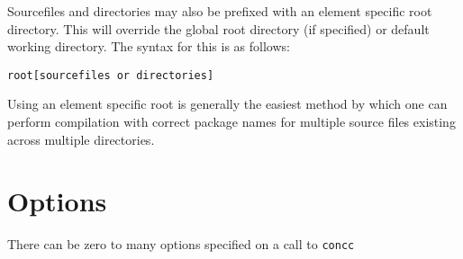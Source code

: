 \documentclass[conc-doc]{subfiles}
\begin{document}
Sourcefiles and directories may also be prefixed with an element specific root directory. This will override the global root directory (if specified) or default working directory. The syntax for this is as follows:

\begin{center}
	\lstinline{root[sourcefiles or directories]}
\end{center}


Using an element specific root is generally the easiest method by which one can perform compilation with correct package names for multiple source files existing across multiple directories.

\section{Options}
There can be zero to many options specified on a call to \lstinline{concc}
\end{document}
